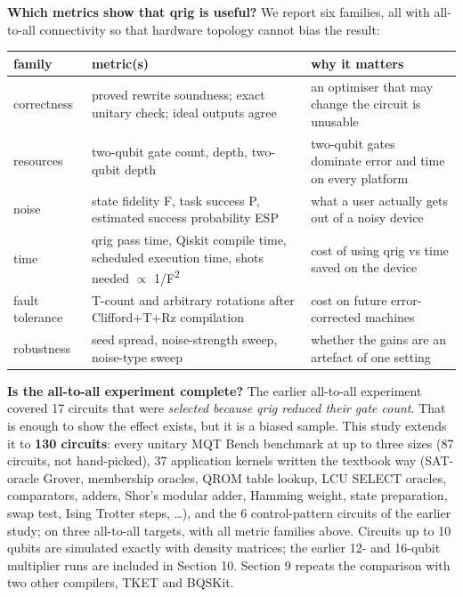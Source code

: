 \documentclass[
  10pt,
]{article}
\newcounter{none} %
\begin{document}
\textbf{Which metrics show that qrig is useful?} We report six families,
all with all-to-all connectivity so that hardware topology cannot bias
the result:

{\def\LTcaptype{none} %
\begin{longtable}[]{@{}
  >{\raggedright\arraybackslash}p{}
  >{\raggedright\arraybackslash}p{}
  >{\raggedright\arraybackslash}p{}@{}}
\toprule\noalign{}
\begin{minipage}[b]{\linewidth}\raggedright
family
\end{minipage} & \begin{minipage}[b]{\linewidth}\raggedright
metric(s)
\end{minipage} & \begin{minipage}[b]{\linewidth}\raggedright
why it matters
\end{minipage} \\
\midrule\noalign{}
\endhead
\bottomrule\noalign{}
\endlastfoot
correctness & proved rewrite soundness; exact unitary check; ideal
outputs agree & an optimiser that may change the circuit is unusable \\
resources & two-qubit gate count, depth, two-qubit depth & two-qubit
gates dominate error and time on every platform \\
noise & state fidelity F, task success P, estimated success probability
ESP & what a user actually gets out of a noisy device \\
time & qrig pass time, Qiskit compile time, scheduled execution time,
shots needed \ensuremath{\propto} 1/F\textsuperscript{2} & cost of using qrig vs time saved on the device \\
fault tolerance & T-count and arbitrary rotations after Clifford+T+Rz
compilation & cost on future error-corrected machines \\
robustness & seed spread, noise-strength sweep, noise-type sweep &
whether the gains are an artefact of one setting \\
\end{longtable}
}

\textbf{Is the all-to-all experiment complete?} The earlier all-to-all
experiment covered 17 circuits that were \emph{selected because qrig
reduced their gate count}. That is enough to show the effect exists, but
it is a biased sample. This study extends it to \textbf{130 circuits}:
every unitary MQT Bench benchmark at up to three sizes (87 circuits, not
hand-picked), 37 application kernels written the textbook way
(SAT-oracle Grover, membership oracles, QROM table lookup, LCU SELECT
oracles, comparators, adders, Shor's modular adder, Hamming weight,
state preparation, swap test, Ising Trotter steps, \ldots), and the 6
control-pattern circuits of the earlier study; on three all-to-all
targets, with all metric families above. Circuits up to 10 qubits are
simulated exactly with density matrices; the earlier 12- and 16-qubit
multiplier runs are included in Section 10. Section 9 repeats the
comparison with two other compilers, TKET and BQSKit.
\end{document}
